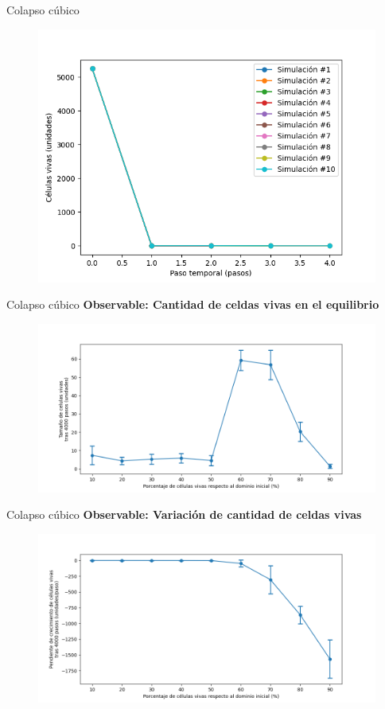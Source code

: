 \begin{frame}{Colapso cúbico}
{\begin{multicols}{3}
        {
            \begin{figure}[H]
                \centering
                \includegraphics[width=0.8\linewidth]{pic/collapse3d/size_i90}
                \label{fig:colapso:size:i90}
            \end{figure}
        }
    \end{multicols}
    }
\end{frame}

\begin{frame}{Colapso cúbico}
    \textbf{Observable: Cantidad de celdas vivas en el equilibrio}
    \begin{figure}[H]
        \centering
        \includegraphics[width=0.8\linewidth]{pic/collapse3d/size_vs_input}
        \label{fig:colapso:size:density}
    \end{figure}
\end{frame}

\begin{frame}{Colapso cúbico}
    \textbf{Observable: Variación de cantidad de celdas vivas}
    \begin{figure}[H]
        \centering
        \includegraphics[width=0.8\linewidth]{pic/collapse3d/size_slope_vs_input}
        \label{fig:colapso:size_slope:density}
    \end{figure}
\end{frame}


